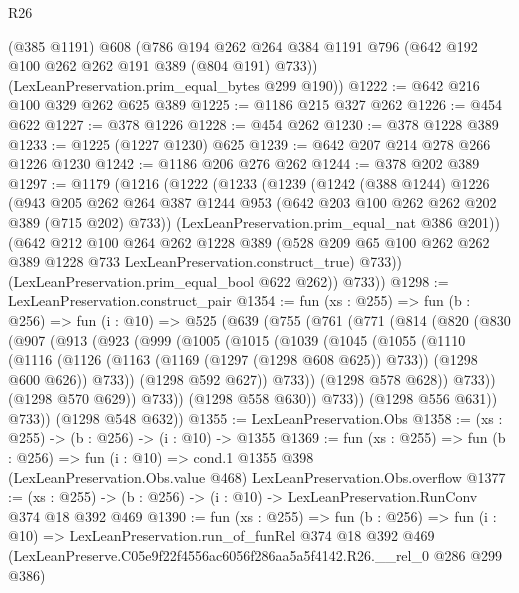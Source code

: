 \begin{lexlean}{R26}
\begin{coremodule}
      (@385 @1191)
      @608
      (@786 @194 @262 @264 @384 @1191 @796 (@642 @192 @100 @262 @262 @191 @389 (@804 @191) @733))
      (LexLeanPreservation.prim_equal_bytes @299 @190))
@1222 := @642 @216 @100 @329 @262 @625 @389
@1225 := @1186 @215 @327 @262
@1226 := @454 @622
@1227 := @378 @1226
@1228 := @454 @262
@1230 := @378 @1228 @389
@1233 := @1225 (@1227 @1230) @625
@1239 := @642 @207 @214 @278 @266 @1226 @1230
@1242 := @1186 @206 @276 @262
@1244 := @378 @202 @389
@1297 := @1179
    (@1216
      (@1222
        (@1233
          (@1239
            (@1242
              (@388 @1244)
              @1226
              (@943
                @205
                @262
                @264
                @387
                @1244
                @953
                (@642 @203 @100 @262 @262 @202 @389 (@715 @202) @733))
              (LexLeanPreservation.prim_equal_nat @386 @201))
            (@642
              @212
              @100
              @264
              @262
              @1228
              @389
              (@528 @209 @65 @100 @262 @262 @389 @1228 @733 LexLeanPreservation.construct_true)
              @733))
          (LexLeanPreservation.prim_equal_bool @622 @262))
        @733))
@1298 := LexLeanPreservation.construct_pair
@1354 := fun (xs : @255) =>
  fun (b : @256) =>
  fun (i : @10) =>
  @525
    (@639
      (@755
        (@761
          (@771
            (@814
              (@820
                (@830
                  (@907
                    (@913
                      (@923
                        (@999
                          (@1005
                            (@1015
                              (@1039
                                (@1045
                                  (@1055
                                    (@1110
                                      (@1116
                                        (@1126
                                          (@1163 (@1169 (@1297 (@1298 @608 @625)) @733))
                                          (@1298 @600 @626))
                                        @733))
                                    (@1298 @592 @627))
                                  @733))
                              (@1298 @578 @628))
                            @733))
                        (@1298 @570 @629))
                      @733))
                  (@1298 @558 @630))
                @733))
            (@1298 @556 @631))
          @733))
      (@1298 @548 @632))
@1355 := LexLeanPreservation.Obs
@1358 := (xs : @255) -> (b : @256) -> (i : @10) -> @1355
@1369 := fun (xs : @255) =>
  fun (b : @256) =>
  fun (i : @10) =>
  cond.{1} @1355 @398 (LexLeanPreservation.Obs.value @468) LexLeanPreservation.Obs.overflow
@1377 := (xs : @255) -> (b : @256) -> (i : @10) -> LexLeanPreservation.RunConv @374 @18 @392 @469
@1390 := fun (xs : @255) =>
  fun (b : @256) =>
  fun (i : @10) =>
  LexLeanPreservation.run_of_funRel
    @374
    @18
    @392
    @469
    (LexLeanPreserve.C05e9f22f4556ac6056f286aa5a5f4142.R26.__rel_0 @286 @299 @386)
\end{coremodule}
\end{lexlean}
